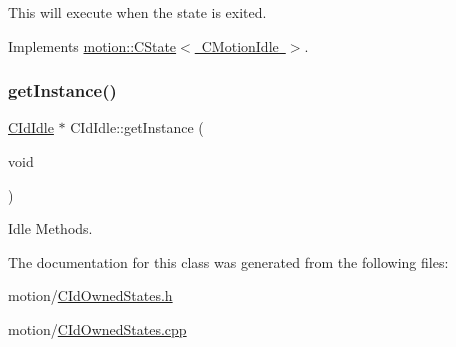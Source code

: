 This will execute when the state is exited. 

Implements \mbox{\hyperlink{classmotion_1_1CState_a353db064c159d66b82bf257b35e7c016}{motion\+::\+C\+State$<$ C\+Motion\+Idle $>$}}.

\mbox{\label{classmotion_1_1CIdIdle_ad2a189a219ab9030d99b46a286761b63}} 
\subsubsection{\texorpdfstring{get\+Instance()}{getInstance()}}
{\footnotesize\ttfamily \mbox{\hyperlink{classmotion_1_1CIdIdle}{C\+Id\+Idle}} $\ast$ C\+Id\+Idle\+::get\+Instance (\begin{DoxyParamCaption}\item[{void}]{ }\end{DoxyParamCaption})\hspace{0.3cm}{\ttfamily [static]}}

Idle Methods. 

The documentation for this class was generated from the following files\+:\begin{DoxyCompactItemize}
\item 
motion/\mbox{\hyperlink{CIdOwnedStates_8h}{C\+Id\+Owned\+States.\+h}}\item 
motion/\mbox{\hyperlink{CIdOwnedStates_8cpp}{C\+Id\+Owned\+States.\+cpp}}\end{DoxyCompactItemize}
